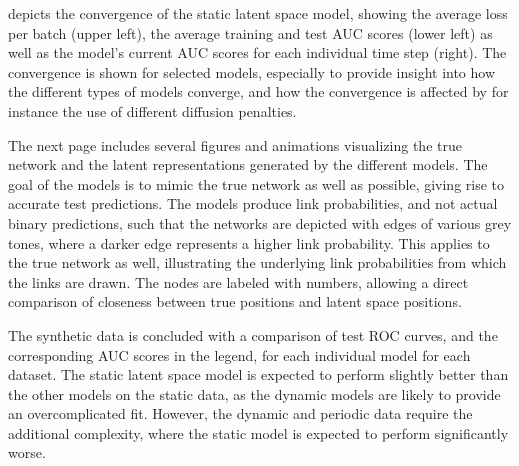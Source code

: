          depicts the convergence of the static latent space model, showing the average loss per batch (upper left), the average training and test AUC scores (lower left) as well as the model's current AUC scores for each individual time step (right). The convergence is shown for selected models, especially to provide insight into how the different types of models converge, and how the convergence is affected by for instance the use of different diffusion penalties.
    
        
        The next page includes several figures and animations visualizing the true network and the latent representations generated by the different models. The goal of the models is to mimic the true network as well as possible, giving rise to accurate test predictions. The models produce link probabilities, and not actual binary predictions, such that the networks are depicted with edges of various grey tones, where a darker edge represents a higher link probability. This applies to the true network as well, illustrating the underlying link probabilities from which the links are drawn. The nodes are labeled with numbers, allowing a direct comparison of closeness between true positions and latent space positions.
        
        The synthetic data is concluded with a comparison of test ROC curves, and the corresponding AUC scores in the legend, for each individual model for each dataset. The static latent space model is expected to perform slightly better than the other models on the static data, as the dynamic models are likely to provide an overcomplicated fit. However, the dynamic and periodic data require the additional complexity, where the static model is expected to perform significantly worse.
        
    
